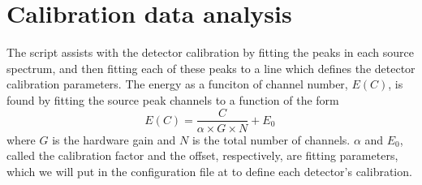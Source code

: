 \section{Calibration data analysis}

The script  assists with the detector
calibration by fitting the peaks in each source spectrum, and then
fitting each of these peaks to a line which defines the detector
calibration parameters. The energy as a funciton of channel number,
$E(C)$, is found by fitting the source peak channels to a function of
the form
\begin{equation}
  \label{eq:calib-lin}
  E(C) = \frac{ C }{ \alpha \times G \times N } + E_0 \,
\end{equation}
where $G$ is the hardware gain and $N$ is the total number of
channels. $\alpha$ and $E_0$, called the calibration factor and the
offset, respectively, are fitting parameters, which we will put in the
configuration file at  to define
each detector's calibration.

